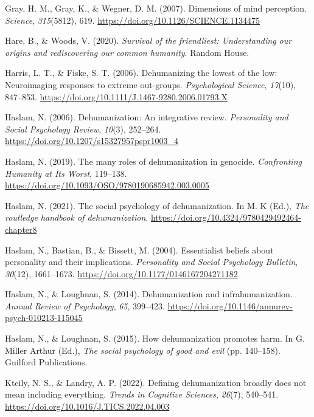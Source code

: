 \documentclass[
]{article}
\newlength{\cslhangindent}
\newlength{\cslentryspacingunit} %
\newenvironment{CSLReferences}[2] %
 {%
  \setlength{\parindent}{0pt}
  \ifodd #1
  \let\oldpar\par
  \def\par{\hangindent=\cslhangindent\oldpar}
  \fi
  \setlength{\parskip}{#2\cslentryspacingunit}
 }%
 {}
\begin{document}
\begin{CSLReferences}{1}{0}
\leavevmode{}%
Gray, H. M., Gray, K., \& Wegner, D. M. (2007). Dimensions of mind perception. \emph{Science}, \emph{315}(5812), 619. \url{https://doi.org/10.1126/SCIENCE.1134475}

\leavevmode{}%
Hare, B., \& Woods, V. (2020). \emph{Survival of the friendliest: Understanding our origins and rediscovering our common humanity}. Random House.

\leavevmode{}%
Harris, L. T., \& Fiske, S. T. (2006). Dehumanizing the lowest of the low: Neuroimaging responses to extreme out-groups. \emph{Psychological Science}, \emph{17}(10), 847--853. \url{https://doi.org/10.1111/J.1467-9280.2006.01793.X}

\leavevmode{}%
Haslam, N. (2006). Dehumanization: An integrative review. \emph{Personality and Social Psychology Review}, \emph{10}(3), 252--264. \url{https://doi.org/10.1207/s15327957pspr1003_4}

\leavevmode{}%
Haslam, N. (2019). The many roles of dehumanization in genocide. \emph{Confronting Humanity at Its Worst}, 119--138. \url{https://doi.org/10.1093/OSO/9780190685942.003.0005}

\leavevmode{}%
Haslam, N. (2021). The social psychology of dehumanization. In M. K (Ed.), \emph{The routledge handbook of dehumanization}. \url{https://doi.org/10.4324/9780429492464-chapter8}

\leavevmode{}%
Haslam, N., Bastian, B., \& Bissett, M. (2004). Essentialist beliefs about personality and their implications. \emph{Personality and Social Psychology Bulletin}, \emph{30}(12), 1661--1673. \url{https://doi.org/10.1177/0146167204271182}

\leavevmode{}%
Haslam, N., \& Loughnan, S. (2014). Dehumanization and infrahumanization. \emph{Annual Review of Psychology}, \emph{65}, 399--423. \url{https://doi.org/10.1146/annurev-psych-010213-115045}

\leavevmode{}%
Haslam, N., \& Loughnan, S. (2015). How dehumanization promotes harm. In G. Miller Arthur (Ed.), \emph{The social psychology of good and evil} (pp. 140--158). Guilford Publications.

\leavevmode{}%
Kteily, N. S., \& Landry, A. P. (2022). Defining dehumanization broadly does not mean including everything. \emph{Trends in Cognitive Sciences}, \emph{26}(7), 540--541. \url{https://doi.org/10.1016/J.TICS.2022.04.003}


\end{CSLReferences}
\end{document}
